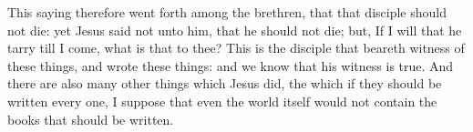 This saying therefore went forth among the brethren, that that disciple should not die: yet Jesus said not unto him, that he should not die; but, If I will that he tarry till I come, what is that to thee?  This is the disciple that beareth witness of these things, and wrote these things: and we know that his witness is true.  And there are also many other things which Jesus did, the which if they should be written every one, I suppose that even the world itself would not contain the books that should be written. 
